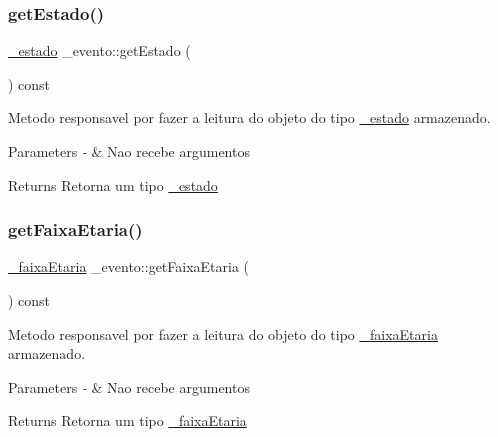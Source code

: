 \subsubsection{\texorpdfstring{getEstado()}{getEstado()}}
{\footnotesize\ttfamily \mbox{\hyperlink{class__estado}{\+\_\+estado}} \+\_\+evento\+::get\+Estado (\begin{DoxyParamCaption}{ }\end{DoxyParamCaption}) const}



Metodo responsavel por fazer a leitura do objeto do tipo \mbox{\hyperlink{class__estado}{\+\_\+estado}} armazenado. 


\begin{DoxyParams}{Parameters}
{\em -\/} & Nao recebe argumentos \\
\hline
\end{DoxyParams}
\begin{DoxyReturn}{Returns}
Retorna um tipo \mbox{\hyperlink{class__estado}{\+\_\+estado}} 
\end{DoxyReturn}
\mbox{\label{class__evento_a74d6c8e752392dc3093c1a296033bbb1}} 
\subsubsection{\texorpdfstring{getFaixaEtaria()}{getFaixaEtaria()}}
{\footnotesize\ttfamily \mbox{\hyperlink{class__faixa_etaria}{\+\_\+faixa\+Etaria}} \+\_\+evento\+::get\+Faixa\+Etaria (\begin{DoxyParamCaption}{ }\end{DoxyParamCaption}) const}



Metodo responsavel por fazer a leitura do objeto do tipo \mbox{\hyperlink{class__faixa_etaria}{\+\_\+faixa\+Etaria}} armazenado. 


\begin{DoxyParams}{Parameters}
{\em -\/} & Nao recebe argumentos \\
\hline
\end{DoxyParams}
\begin{DoxyReturn}{Returns}
Retorna um tipo \mbox{\hyperlink{class__faixa_etaria}{\+\_\+faixa\+Etaria}} 
\end{DoxyReturn}
\mbox{\label{class__evento_a039cedaa58c39d2d414337b802f7a03c}} 
